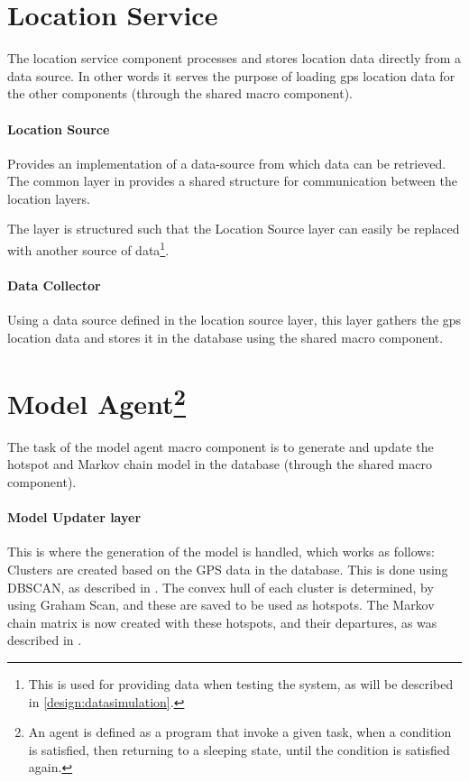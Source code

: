 \section{Location Service} 
The location service component processes and stores location data directly from a data source.
In other words it serves the purpose of loading gps location data for the other components (through the shared macro component).

\paragraph{Location Source} Provides an implementation of a data-source from which data can be retrieved.
The common layer in provides a shared structure for communication between the location layers.

The layer is structured such that the Location Source layer can easily be replaced with another source of data\footnote{This is used for providing data when testing the system, as will be described in \cref{design:datasimulation}.}.

\paragraph{Data Collector} Using a data source defined in the location source layer, this layer gathers the gps location data and stores it in the database using the shared macro component.

\section[Model Agent]{Model Agent\footnote{An agent is defined as a program that invoke a given task, when a condition is satisfied, then returning to a sleeping state, until the condition is satisfied again.\cite{definitionagent}}}
The task of the model agent macro component is to generate and update the hotspot and Markov chain model in the database (through the shared macro component).

\paragraph{Model Updater layer} This is where the generation of the model is handled, which works as follows:\\
Clusters are created based on the GPS data in the database.
This is done using DBSCAN, as described in .
The convex hull of each cluster is determined, by using Graham Scan, and these are saved to be used as hotspots.
The Markov chain matrix is now created with these hotspots, and their departures, as was described in .

